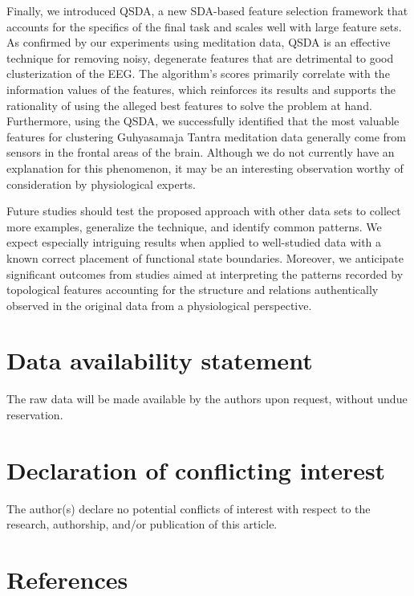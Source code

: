 \documentclass[10pt]{iopart}
\begin{document}
Finally, we introduced QSDA, a new SDA-based feature selection framework that accounts for the specifics of the final task and scales well with large feature sets. As confirmed by our experiments using meditation data, QSDA is an effective technique for removing noisy, degenerate features that are detrimental to good clusterization of the EEG. The algorithm's scores primarily correlate with the information values of the features, which reinforces its results and supports the rationality of using the alleged best features to solve the problem at hand. Furthermore, using the QSDA, we successfully identified that the most valuable features for clustering Guhyasamaja Tantra meditation data generally come from sensors in the frontal areas of the brain. Although we do not currently have an explanation for this phenomenon, it may be an interesting observation worthy of consideration by physiological experts.

Future studies should test the proposed approach with other data sets to collect more examples, generalize the technique, and identify common patterns. We expect especially intriguing results when applied to well-studied data with a known correct placement of functional state boundaries. Moreover, we anticipate significant outcomes from studies aimed at interpreting the patterns recorded by topological features accounting for the structure and relations authentically observed in the original data from a physiological perspective.

\section*{Data availability statement}

The raw data will be made available by the authors upon request, without undue reservation.

\section*{Declaration of conflicting interest}

The author(s) declare no potential conflicts of interest with respect to the research, authorship, and/or publication of this article.

\section*{References}

{}

\end{document}
